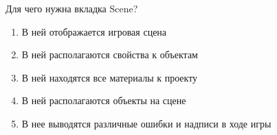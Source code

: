 
Для чего нужна вкладка Scene?

\begin{enumerate}
    \item В ней отображается игровая сцена
    \item В ней располагаются свойства к объектам
    \item В ней находятся все материалы к проекту
    \item В ней располагаются объекты на сцене
    \item В нее выводятся различные ошибки и надписи в ходе игры
\end{enumerate}